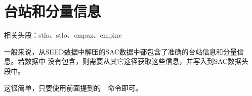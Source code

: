 \section{台站和分量信息}
相关头段：stla、stlo、cmpaz、cmpinc

一般来说，从SEED数据中解压的SAC数据中都包含了准确的台站信息和分量信息。若数据中
没有包含，则需要从其它途径获取这些信息，并写入到SAC数据头段中。

这很简单，只要使用前面提到的~~命令即可。
